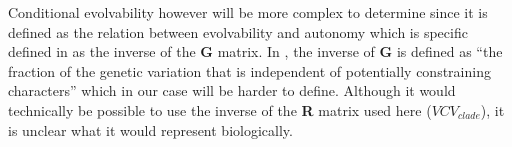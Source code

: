 \documentclass[12pt,a4paper]{article}
\begin{document}
Conditional evolvability however will be more complex to determine since it is defined as the relation between evolvability and autonomy which is specific defined in \cite{hansen2008measuring} as the inverse of the \textbf{G} matrix.
In \cite{hansen2008measuring}, the inverse of \textbf{G} is defined as ``the fraction of the genetic variation that is independent of potentially constraining characters'' which in our case will be harder to define.
Although it would technically be possible to use the inverse of the \textbf{R} matrix used here ($VCV_{clade}$), it is unclear what it would represent biologically.

%
%



\end{document}
